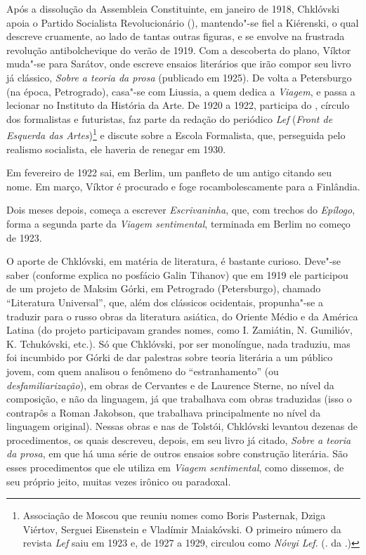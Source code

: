 Após a dissolução da Assembleia Constituinte, em janeiro de 1918,
Chklóvski apoia o Partido Socialista Revolucionário (),
mantendo"-se fiel a Kiérenski, o qual descreve cruamente, ao lado
de tantas outras figuras, e se envolve na frustrada revolução
antibolchevique do verão de 1919. Com a descoberta do plano,
Víktor muda"-se para Sarátov, onde escreve ensaios literários
que irão compor seu livro já clássico, \emph{Sobre a teoria da
prosa} (publicado em 1925). De volta a Petersburgo (na época,
Petrogrado), casa"-se com Liussia, a quem dedica a \emph{Viagem},
e passa a lecionar no Instituto da História da Arte. De
1920 a 1922, participa do , círculo dos formalistas
e futuristas, faz parte da redação do periódico \emph{Lef}
(\emph{Front de Esquerda das Artes})\footnote{Associação de
Moscou que reuniu nomes como Boris Pasternak, Dziga Viértov,
Serguei Eisenstein e Vladímir Maiakóvski. O primeiro número da
revista \emph{Lef} saiu em 1923 e, de 1927 a 1929, circulou como
\emph{Nóvyi Lef}. (. da .)} e discute sobre a Escola
Formalista, que, perseguida pelo realismo socialista, ele haveria
de renegar em 1930.

Em fevereiro de 1922 sai, em Berlim, um panfleto de um antigo
 citando seu nome. Em março, Víktor é procurado e
foge rocambolescamente para a Finlândia.

Dois meses depois, começa a escrever \emph{Escrivaninha}, que,
com trechos do \emph{Epílogo}, forma a segunda parte da
\emph{Viagem sentimental}, terminada em Berlim no começo de 1923.

O aporte de Chklóvski, em matéria de literatura, é bastante
curioso. Deve"-se saber (conforme explica no posfácio Galin
Tihanov) que em 1919 ele participou de um projeto de Maksim
Górki, em Petrogrado (Petersburgo), chamado ``Literatura
Universal'', que, além dos clássicos ocidentais, propunha"-se
a traduzir para o russo obras da literatura asiática, do Oriente
Médio e da América Latina (do projeto participavam grandes nomes,
como I. Zamiátin, N. Gumilióv, K. Tchukóvski, etc.). Só que
Chklóvski, por ser monolíngue, nada traduziu, mas foi incumbido
por Górki de dar palestras sobre teoria literária a um público
jovem, com quem analisou o fenômeno do ``estranhamento''
(ou \emph{desfamiliarização}), em obras de Cervantes e de
Laurence Sterne, no nível da composição, e não da linguagem,
já que trabalhava com obras traduzidas (isso o contrapôs a
Roman Jakobson, que trabalhava principalmente no nível da
linguagem original). Nessas obras e nas de Tolstói, Chklóvski
levantou dezenas de procedimentos, os quais descreveu, depois,
em seu livro já citado, \emph{Sobre a teoria da prosa}, em que
há uma série de outros ensaios sobre construção literária. São
esses procedimentos que ele utiliza em \emph{Viagem sentimental},
como dissemos, de seu próprio jeito, muitas vezes irônico
ou paradoxal.

